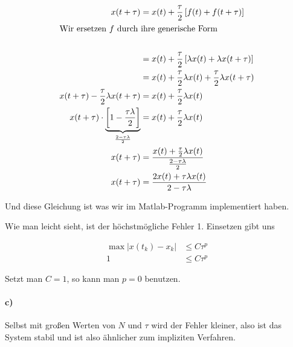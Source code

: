 \documentclass[ngerman,a4paper]{scrartcl}
\begin{document}
\begin{align*}
  x(t + \tau) &= x(t) + \frac{\tau}{2} \left[f(t) + f(t+\tau)\right]\\
  \intertext{Wir ersetzen $f$ durch ihre generische Form}\\
  &= x(t) + \frac{\tau}{2} \left[ \lambda x(t) + \lambda x(t+\tau) \right]\\
  &= x(t) + \frac{\tau}{2} \lambda x(t) + \frac{\tau}{2} \lambda x(t+\tau)\\
  x(t + \tau) - \frac{\tau}{2} \lambda x(t+\tau) &= x(t) + \frac{\tau}{2} \lambda x(t)\\
  x(t + \tau)\cdot \underbrace{\left[1 - \frac{\tau\lambda}{2}\right]}_{\frac{2-\tau\lambda}{2}} &= x(t) + \frac{\tau}{2} \lambda x(t)\\
  x(t + \tau) &= \frac{x(t) + \frac{\tau}{2} \lambda x(t)}{\frac{2-\tau\lambda}{2}}\\
  x(t + \tau) &= \frac{2x(t) + \tau\lambda x(t)}{2 - \tau\lambda}
\end{align*}

Und diese Gleichung ist was wir im Matlab-Programm implementiert
haben.

Wie man leicht sieht, ist der höchstmögliche Fehler 1. Einsetzen gibt uns

\begin{align*}
  \max |x(t_k) - x_k | &\leq C \tau^p\\
  1 &\leq C \tau^p
\end{align*}

Setzt man $C=1$, so kann man $p=0$ benutzen.

\paragraph{c)}

Selbst mit großen Werten von $N$ und $\tau$ wird der Fehler kleiner,
also ist das System stabil und ist also ähnlicher zum impliziten
Verfahren.
\end{document}
